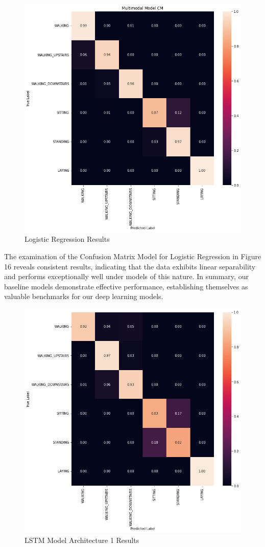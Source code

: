 \documentclass[conference]{IEEEtran}
\begin{document}
\begin{figure}[h!]
	\includegraphics[width= 0.9 \linewidth]{logisticRegression.png}
	\centering
	\caption{Logistic Regression Results}
	\label{logisticRegression.png}
\end{figure}
The examination of the Confusion Matrix Model for Logistic Regression in Figure 16 reveals consistent results, indicating that the data exhibits linear separability and performs exceptionally well under models of this nature. In summary, our baseline models demonstrate effective performance, establishing themselves as valuable benchmarks for our deep learning models.
\begin{figure}[h!]
	\includegraphics[width= 0.9 \linewidth]{LSTM(1)_Results.png}
	\centering
	\caption{LSTM Model Architecture 1 Results}
	\label{LSTM(1)_Results.png}
\end{figure}
\end{document}
